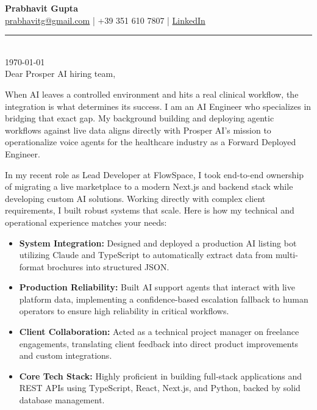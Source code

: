 \documentclass[11pt,a4paper]{article}
\begin{document}
{\Large \textbf{Prabhavit Gupta}} \\[1ex]
\href{mailto:prabhavitg@gmail.com}{prabhavitg@gmail.com} | +39 351 610 7807 | \href{https://www.linkedin.com/in/prabhavit/}{LinkedIn} \\[2ex]
\noindent\rule{\textwidth}{0.4pt} \\[2ex]


\today \\[2ex]

Dear Prosper AI hiring team,


When AI leaves a controlled environment and hits a real clinical workflow, the integration is what determines its success. I am an AI Engineer who specializes in bridging that exact gap. My background building and deploying agentic workflows against live data aligns directly with Prosper AI's mission to operationalize voice agents for the healthcare industry as a Forward Deployed Engineer.


In my recent role as Lead Developer at FlowSpace, I took end-to-end ownership of migrating a live marketplace to a modern Next.js and backend stack while developing custom AI solutions. Working directly with complex client requirements, I built robust systems that scale. Here is how my technical and operational experience matches your needs:


\begin{itemize}
    \item {\textbf{System Integration:} Designed and deployed a production AI listing bot utilizing Claude and TypeScript to automatically extract data from multi-format brochures into structured JSON.}
    \item {\textbf{Production Reliability:} Built AI support agents that interact with live platform data, implementing a confidence-based escalation fallback to human operators to ensure high reliability in critical workflows.}
    \item {\textbf{Client Collaboration:} Acted as a technical project manager on freelance engagements, translating client feedback into direct product improvements and custom integrations.}
    \item {\textbf{Core Tech Stack:} Highly proficient in building full-stack applications and REST APIs using TypeScript, React, Next.js, and Python, backed by solid database management.}
\end{itemize}
\vspace{6pt}
\end{document}
